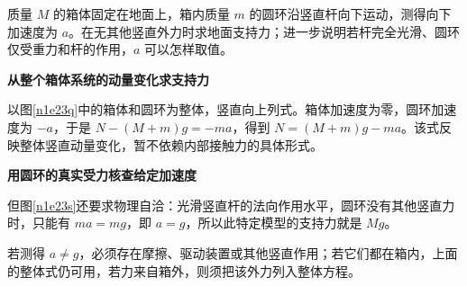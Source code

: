 \begin{question}\begin{example}[箱内运动与称重条件]\label{n1e23}
质量 $M$ 的箱体固定在地面上，箱内质量 $m$ 的圆环沿竖直杆向下运动，测得向下加速度为 $a$。在无其他竖直外力时求地面支持力；进一步说明若杆完全光滑、圆环仅受重力和杆的作用，$a$ 可以怎样取值。
\end{example}\end{question}
\begin{solution}\textbf{从整个箱体系统的动量变化求支持力}\par\nobreak
以图\ref{n1e23q}中的箱体和圆环为整体，竖直向上列式。箱体加速度为零，圆环加速度为 $-a$，于是 $N-(M+m)g=-ma$，得到 $N=(M+m)g-ma$。该式反映整体竖直动量变化，暂不依赖内部接触力的具体形式。


\par\medskip{}\noindent\textbf{用圆环的真实受力核查给定加速度}\par\nobreak
但图\ref{n1e23s}还要求物理自洽：光滑竖直杆的法向作用水平，圆环没有其他竖直力时，只能有 $ma=mg$，即 $a=g$，所以此特定模型的支持力就是 $Mg$。

若测得 $a\ne g$，必须存在摩擦、驱动装置或其他竖直作用；若它们都在箱内，上面的整体式仍可用，若力来自箱外，则须把该外力列入整体方程。
\end{solution}


